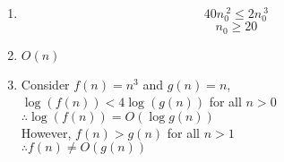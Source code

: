 \documentclass[fleqn,a4paper,12pt]{article}
\begin{document}
\begin{enumerate}
\item
  \[ 40n_0^{\ 2}\leq 2n_0^{\ 3} \]
  \[ n_0 \geq 20 \]

\item
    $ O(n) $

\item
  
  Consider $f(n)=n^3$ and $g(n)=n$,\\
  $\log (f(n)) < 4 \log (g(n))$ for all $n>0$\\
  $\therefore \log (f(n)) = O(\log g(n))$\\
  However, $f(n) > g(n)$ for all $n>1$\\
  $\therefore f(n) \neq O(g(n))$\\

\end{enumerate}
\end{document}
